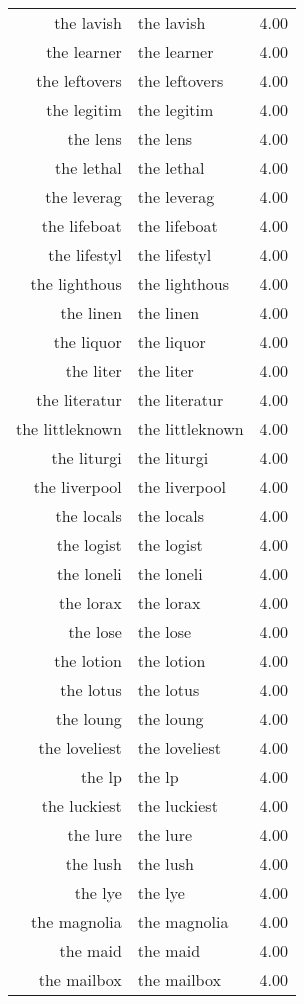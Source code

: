 \begin{table}[ht]
\begin{tabular}{rlr}
  the lavish & the lavish & 4.00 \\ 
  the learner & the learner & 4.00 \\ 
  the leftovers & the leftovers & 4.00 \\ 
  the legitim & the legitim & 4.00 \\ 
  the lens & the lens & 4.00 \\ 
  the lethal & the lethal & 4.00 \\ 
  the leverag & the leverag & 4.00 \\ 
  the lifeboat & the lifeboat & 4.00 \\ 
  the lifestyl & the lifestyl & 4.00 \\ 
  the lighthous & the lighthous & 4.00 \\ 
  the linen & the linen & 4.00 \\ 
  the liquor & the liquor & 4.00 \\ 
  the liter & the liter & 4.00 \\ 
  the literatur & the literatur & 4.00 \\ 
  the littleknown & the littleknown & 4.00 \\ 
  the liturgi & the liturgi & 4.00 \\ 
  the liverpool & the liverpool & 4.00 \\ 
  the locals & the locals & 4.00 \\ 
  the logist & the logist & 4.00 \\ 
  the loneli & the loneli & 4.00 \\ 
  the lorax & the lorax & 4.00 \\ 
  the lose & the lose & 4.00 \\ 
  the lotion & the lotion & 4.00 \\ 
  the lotus & the lotus & 4.00 \\ 
  the loung & the loung & 4.00 \\ 
  the loveliest & the loveliest & 4.00 \\ 
  the lp & the lp & 4.00 \\ 
  the luckiest & the luckiest & 4.00 \\ 
  the lure & the lure & 4.00 \\ 
  the lush & the lush & 4.00 \\ 
  the lye & the lye & 4.00 \\ 
  the magnolia & the magnolia & 4.00 \\ 
  the maid & the maid & 4.00 \\ 
  the mailbox & the mailbox & 4.00 \\ 

\end{tabular}
\end{table}
